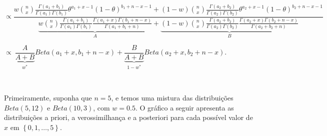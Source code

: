 \documentclass[
]{book}
\begin{document}
\(\propto\dfrac{w\binom{n}{x}\frac{\Gamma(a_1+b_1)}{\Gamma(a_1)\Gamma(b_1)}\theta^{a_1+x-1}(1-\theta)^{b_1+n-x-1}+(1-w)\binom{n}{x}\frac{\Gamma(a_2+b_2)}{\Gamma(a_2)\Gamma(b_2)}\theta^{a_2+x-1}(1-\theta)^{b_2+n-x-1}}{\underbrace{w\binom{n}{x}\frac{\Gamma(a_1+b_1)}{\Gamma(a_1)\Gamma(b_1)}\frac{\Gamma(a_1+x)\Gamma(b_1+n-x)}{\Gamma(a_1+b_1+n)}}_{A}+\underbrace{(1-w)\binom{n}{x}\frac{\Gamma(a_2+b_2)}{\Gamma(a_2)\Gamma(b_2)}\frac{\Gamma(a_2+x)\Gamma(b_2+n-x)}{\Gamma(a_2+b_2+n)}}_{B}}\)

\(\propto~\underbrace{\dfrac{A}{A+B}}_{w^*}Beta(a_1+x,b_1+n-x)+\underbrace{\dfrac{B}{A+B}}_{1-w^*}Beta(a_2+x,b_2+n-x)\).

\(~\)

Primeiramente, suponha que \(n=5\), e temos uma mistura das distribuições \(Beta(5,12)\) e \(Beta(10,3)\), com \(w=0.5\). O gráfico a seguir apresenta as distribuições a priori, a verossimilhança e a posteriori para cada possível valor de \(x\) em \(\left\{0,1,\ldots,5\right\}\).
\end{document}
